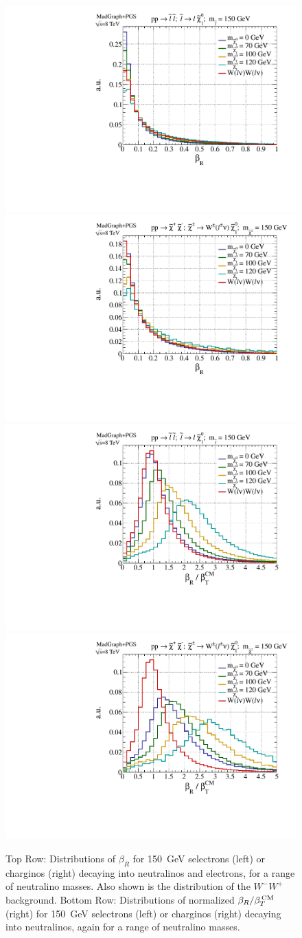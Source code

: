 \begin{figure}[ht]
\includegraphics[width=0.4\columnwidth]{fig/sectionII/betaR_1D_slepton.pdf}
\includegraphics[width=0.4\columnwidth]{fig/sectionII/betaR_1D_chargino.pdf}
\includegraphics[width=0.4\columnwidth]{fig/sectionII/betaR_norm_1D_slepton.pdf}
\includegraphics[width=0.4\columnwidth]{fig/sectionII/betaR_norm_1D_chargino.pdf}

\caption{Top Row: Distributions of $\beta_R$ for 150~GeV selectrons (left) or charginos (right) decaying into neutralinos and electrons, for a range of neutralino masses. Also shown is the distribution of the $W^-W^+$ background. Bottom Row: Distributions of normalized $\beta_R/\beta_T^{\, \rm CM}$ (right) for 150~GeV selectrons (left) or charginos (right) decaying into neutralinos, again for a range of neutralino masses. \label{fig:beta}}
\end{figure}

